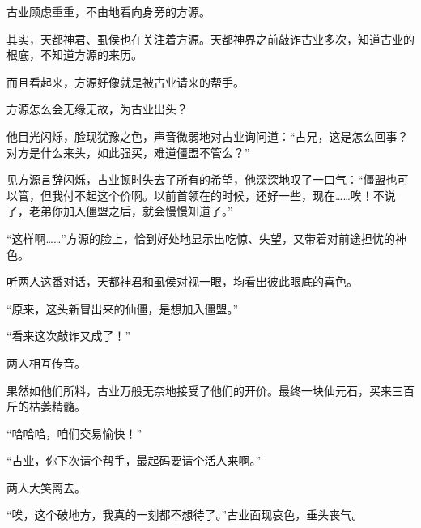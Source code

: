 \begin{this_body}
古业顾虑重重，不由地看向身旁的方源。

其实，天都神君、虱侯也在关注着方源。天都神界之前敲诈古业多次，知道古业的根底，不知道方源的来历。

而且看起来，方源好像就是被古业请来的帮手。

方源怎么会无缘无故，为古业出头？

他目光闪烁，脸现犹豫之色，声音微弱地对古业询问道：“古兄，这是怎么回事？对方是什么来头，如此强买，难道僵盟不管么？”

见方源言辞闪烁，古业顿时失去了所有的希望，他深深地叹了一口气：“僵盟也可以管，但我付不起这个价啊。以前首领在的时候，还好一些，现在……唉！不说了，老弟你加入僵盟之后，就会慢慢知道了。”

“这样啊……”方源的脸上，恰到好处地显示出吃惊、失望，又带着对前途担忧的神色。

听两人这番对话，天都神君和虱侯对视一眼，均看出彼此眼底的喜色。

“原来，这头新冒出来的仙僵，是想加入僵盟。”

“看来这次敲诈又成了！”

两人相互传音。

果然如他们所料，古业万般无奈地接受了他们的开价。最终一块仙元石，买来三百斤的枯萎精髓。

“哈哈哈，咱们交易愉快！”

“古业，你下次请个帮手，最起码要请个活人来啊。”

两人大笑离去。

“唉，这个破地方，我真的一刻都不想待了。”古业面现哀色，垂头丧气。

\end{this_body}

